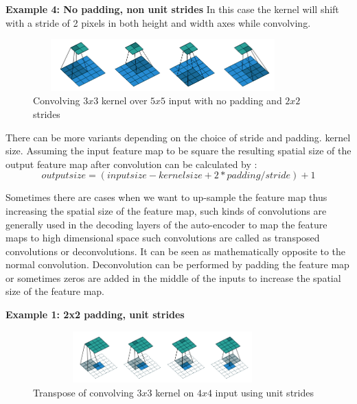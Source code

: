     
    \textbf{Example 4: No padding, non unit strides}
    In this case the kernel will shift with a stride of 2 pixels in both height and width axes while convolving. 
      \begin{figure}[h]
    \centering
    \includegraphics[width=10cm, height =2cm]{images/cnn_case5.png}
    \caption{Convolving $3x3$ \cite{https://doi.org/10.48550/arxiv.1603.07285} kernel over $5x5$ input with no padding and $2x2$ strides }
    \end{figure}
     
   There can be more variants depending on the choice of stride and padding. kernel size. Assuming the input feature map to be square the resulting spatial size of the output feature map after convolution can be calculated by \cite{https://doi.org/10.48550/arxiv.1603.07285}:
   \begin{equation}
      output size = (input size - kernel size + 2 * padding / stride) + 1
   \end{equation}
   
   
   
   Sometimes there are cases when we want to up-sample the feature map thus increasing the spatial size of the feature map, such kinds of convolutions are generally used in the decoding layers of the auto-encoder to map the feature maps to high dimensional space such convolutions are called as transposed convolutions or deconvolutions. It can be seen as mathematically opposite to the normal convolution. Deconvolution can be performed by padding the feature map or sometimes zeros are added in the middle of the inputs to increase the spatial size of the feature map. \newline
  
    \textbf{Example 1:  2x2 padding,  unit strides}
     \begin{figure}[h]
    \centering
    \includegraphics[width=10cm, height =2cm]{images/tranpose_case1.png}
    \caption{ Transpose of convolving $3x3$ kernel on $4x4$ input using unit strides \cite{https://doi.org/10.48550/arxiv.1603.07285}}
    \end{figure}
    
